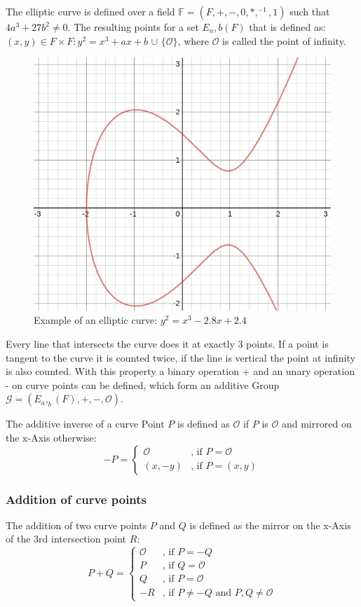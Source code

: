 \documentclass[a4paper,12pt]{scrartcl}
\begin{document}
The elliptic curve is defined over a field $\mathbb{F} = (F, +, -, 0, *, ^{-1}, 1)$ such that $4a^{3} + 27b^{2} \neq 0$.
The resulting points for a set $E_a,b (F)$ that is defined as: ${(x,y) \in F \times F: y^{2} = x^{3} + ax + b}$ $\cup$ $\{\mathcal{O}\}$, where $\mathcal{O}$ is called the point of infinity.

\begin{figure}[hbt!]
	\centering
	\includegraphics[width=0.5\linewidth]{ec1}
	\caption[]{Example of an elliptic curve: $y^2 = x^3 - 2.8x + 2.4$}
	\label{fig:ec-b2}
\end{figure}


Every line that intersects the curve does it at exactly 3 points. If a point is tangent to the curve it is counted twice, if the line is vertical the point at infinity is also counted. With this property a binary operation + and an unary operation - on curve points can be defined, which form an additive Group $\mathcal{G} = (E_a,_b (F), +, -, \mathcal{O})$.

The additive inverse of a curve Point $P$ is defined as $\mathcal{O}$ if $P$ is $\mathcal{O}$ and mirrored on the x-Axis otherwise:
\[
-P =
\begin{cases}
\mathcal{O} & \text{, if } P = \mathcal{O} \\
(x,-y) & \text{, if } P = (x,y)
\end{cases}
\]

\subsubsection{Addition of curve points}
The addition of two curve points $P$ and $Q$ is defined as the mirror on the x-Axis of the 3rd intersection point $R$:
\[
P+Q =
\begin{cases}
\mathcal{O} & \text{, if } P = -Q \\
P & \text{, if } Q = \mathcal{O} \\
Q & \text{, if } P = \mathcal{O} \\
-R & \text{, if } P \neq -Q \text{ and } P,Q \neq \mathcal{O}
\end{cases}
\]
\end{document}
